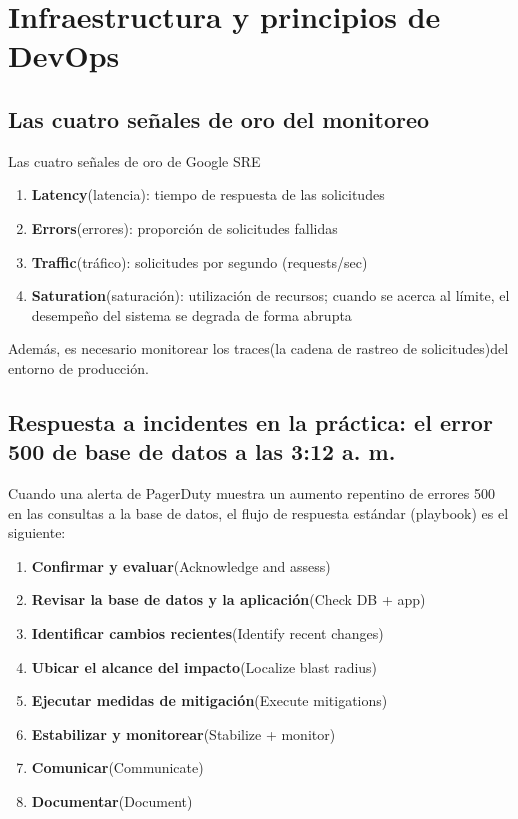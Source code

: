 \section{Infraestructura y principios de DevOps}

\subsection{Las cuatro señales de oro del monitoreo}

\begin{importantbox}{Las cuatro señales de oro de Google SRE}
\begin{enumerate}
    \item \textbf{Latency}(latencia): tiempo de respuesta de las solicitudes
    \item \textbf{Errors}(errores): proporción de solicitudes fallidas
    \item \textbf{Traffic}(tráfico): solicitudes por segundo (requests/sec)
    \item \textbf{Saturation}(saturación): utilización de recursos; cuando se acerca al límite, el desempeño del sistema se degrada de forma abrupta
\end{enumerate}
Además, es necesario monitorear los traces(la cadena de rastreo de solicitudes)del entorno de producción.
\end{importantbox}

\subsection{Respuesta a incidentes en la práctica: el error 500 de base de datos a las 3:12 a. m.}

Cuando una alerta de PagerDuty muestra un aumento repentino de errores 500 en las consultas a la base de datos, el flujo de respuesta estándar (playbook) es el siguiente:

\begin{enumerate}
    \item \textbf{Confirmar y evaluar}(Acknowledge and assess)
    \item \textbf{Revisar la base de datos y la aplicación}(Check DB + app)
    \item \textbf{Identificar cambios recientes}(Identify recent changes)
    \item \textbf{Ubicar el alcance del impacto}(Localize blast radius)
    \item \textbf{Ejecutar medidas de mitigación}(Execute mitigations)
    \item \textbf{Estabilizar y monitorear}(Stabilize + monitor)
    \item \textbf{Comunicar}(Communicate)
    \item \textbf{Documentar}(Document)
\end{enumerate}

